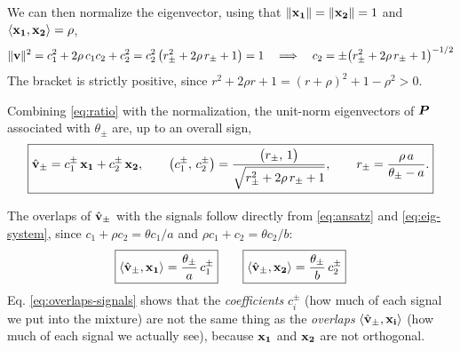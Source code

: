 \noindent
We can then normalize the eigenvector, using that $ \|\boldsymbol{\mathbf{x_1}} \| =  \|\boldsymbol{\mathbf{x_2}} \| = 1$ and $\langle \boldsymbol{\mathbf{x_1}},\boldsymbol{\mathbf{x_2}}\rangle = \rho$,
\begin{equation}
     \|\boldsymbol{\mathbf{v}} \|^2 = c_1^2 + 2\rho\, c_1 c_2 + c_2^2
    = c_2^2\,\big( r_\pm^2 + 2\rho\, r_\pm + 1 \big) = 1
    \quad \Longrightarrow \quad
    c_2 = \pm \big( r_\pm^2 + 2\rho\, r_\pm + 1 \big)^{-1/2}
\end{equation}
The bracket is strictly positive, since $r^2 + 2\rho r + 1 = (r+\rho)^2 + 1 - \rho^2 > 0$.

\noindent
Combining \eqref{eq:ratio} with the normalization, the unit-norm eigenvectors of $\bm{P}$ associated with $\theta_\pm$ are, up to an overall sign,
\begin{equation}
    \boxed{
    \hat{\boldsymbol{\mathbf{v}}}_\pm = c_1^\pm\,\boldsymbol{\mathbf{x_1}} + c_2^\pm\,\boldsymbol{\mathbf{x_2}},
    \qquad
    \big(c_1^\pm,\, c_2^\pm\big) = \frac{\big(r_\pm,\, 1\big)}{\sqrt{r_\pm^2 + 2\rho\, r_\pm + 1}},
    \qquad
    r_\pm = \frac{\rho\, a}{\theta_\pm - a} .
    }
    \label{eq:v-final}
\end{equation}

\noindent
The overlaps of $\hat{\boldsymbol{\mathbf{v}}}_\pm$ with the signals follow directly from \eqref{eq:ansatz} and \eqref{eq:eig-system}, since $c_1 + \rho c_2 = \theta c_1/a$ and $\rho c_1 + c_2 = \theta c_2/b$:
\begin{equation}
\boxed{
    \langle \hat{\boldsymbol{\mathbf{v}}}_\pm, \boldsymbol{\mathbf{x_1}}\rangle = \frac{\theta_\pm}{a}\, c_1^\pm}
    \qquad
    \boxed{
    \langle \hat{\boldsymbol{\mathbf{v}}}_\pm, \boldsymbol{\mathbf{x_2}}\rangle = \frac{\theta_\pm}{b}\, c_2^\pm}
    \label{eq:overlaps-signals}
\end{equation}
Eq. \eqref{eq:overlaps-signals} shows that the \emph{coefficients} $c_i^\pm$ (how much of each signal we put into the mixture) are not the same thing as the \emph{overlaps} $\langle \hat{\boldsymbol{\mathbf{v}}}_\pm, \boldsymbol{\mathbf{x_i}}\rangle$ (how much of each signal we actually see), because $\boldsymbol{\mathbf{x_1}}$ and $\boldsymbol{\mathbf{x_2}}$ are not orthogonal.

